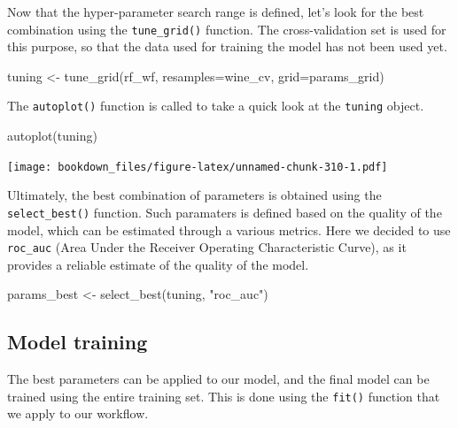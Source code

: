 \documentclass[
]{krantz}
\makeatletter
\newenvironment{Shaded}{\begin{snugshade}}{\end{snugshade}}
\newcommand{\AttributeTok}[1]{\textcolor[rgb]{0.61,0.61,0.61}{#1}}
\newcommand{\FunctionTok}[1]{\textcolor[rgb]{0,0,0}{#1}}
\newcommand{\NormalTok}[1]{#1}
\newcommand{\OtherTok}[1]{\textcolor[rgb]{0.37,0.37,0.37}{#1}}
\newcommand{\StringTok}[1]{\textcolor[rgb]{0.5,0.5,0.5}{#1}}
\newenvironment{kframe}{%
\medskip{}
\setlength{\fboxsep}{.8em}
 \def\at@end@of@kframe{}%
 \ifinner\ifhmode%
  \def\at@end@of@kframe{\end{minipage}}%
  \begin{minipage}{\columnwidth}%
 \fi\fi%
 \def\FrameCommand##1{\hskip\@totalleftmargin \hskip-\fboxsep
 \colorbox{shadecolor}{##1}\hskip-\fboxsep
     \hskip-\linewidth \hskip-\@totalleftmargin \hskip\columnwidth}%
 \MakeFramed {\advance\hsize-\width
   \@totalleftmargin\z@ \linewidth\hsize
   \@setminipage}}%
 {\par\unskip\endMakeFramed%
 \at@end@of@kframe}
\renewenvironment{Shaded}{\begin{kframe}}{\end{kframe}}
\makeatother
\begin{document}
Now that the hyper-parameter search range is defined, let's look for the best combination using the \texttt{tune\_grid()} function. The cross-validation set is used for this purpose, so that the data used for training the model has not been used yet.

\begin{Shaded}
\begin{Highlighting}[]
\NormalTok{tuning }\OtherTok{\textless{}{-}} \FunctionTok{tune\_grid}\NormalTok{(rf\_wf, }\AttributeTok{resamples=}\NormalTok{wine\_cv, }\AttributeTok{grid=}\NormalTok{params\_grid)}
\end{Highlighting}
\end{Shaded}

The \texttt{autoplot()} function is called to take a quick look at the \texttt{tuning} object.

\begin{Shaded}
\begin{Highlighting}[]
\FunctionTok{autoplot}\NormalTok{(tuning)}
\end{Highlighting}
\end{Shaded}

\texttt{[image: bookdown\_files/figure-latex/unnamed-chunk-310-1.pdf]}

Ultimately, the best combination of parameters is obtained using the \texttt{select\_best()} function. Such paramaters is defined based on the quality of the model, which can be estimated through a various metrics. Here we decided to use \texttt{roc\_auc} (Area Under the Receiver Operating Characteristic Curve), as it provides a reliable estimate of the quality of the model.

\begin{Shaded}
\begin{Highlighting}[]
\NormalTok{params\_best }\OtherTok{\textless{}{-}} \FunctionTok{select\_best}\NormalTok{(tuning, }\StringTok{"roc\_auc"}\NormalTok{)}
\end{Highlighting}
\end{Shaded}

\hypertarget{model-training}{%
\subsection{Model training}\label{model-training}}

The best parameters can be applied to our model, and the final model can be trained using the entire training set. This is done using the \texttt{fit()} function that we apply to our workflow.
\end{document}
